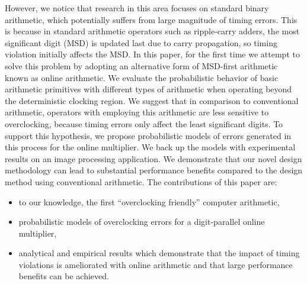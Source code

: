 \documentclass{acm_proc_article-sp}
\begin{document}
However, we notice that research in this area focuses on standard binary arithmetic, which potentially suffers from large magnitude of timing errors. This is because in standard arithmetic operators such as ripple-carry adders, the most significant digit (MSD) is updated last due to carry propagation, so timing violation initially affects the MSD. In this paper, for the first time we attempt to solve this problem by adopting an alternative form of MSD-first arithmetic known as online arithmetic. We evaluate the probabilistic behavior of basic arithmetic primitives with different types of arithmetic when operating beyond the deterministic clocking region. We suggest that in comparison to conventional arithmetic, operators with employing this arithmetic are less sensitive to overclocking, because timing errors only affect the least significant digits. To support this hypothesis, we propose probabilistic models of errors generated in this process for the online multiplier. We back up the models with experimental results on an image processing application. We demonstrate that our novel design methodology can lead to substantial performance benefits compared to the design method using conventional arithmetic. The contributions of this paper are:
%
\begin{itemize}
\vspace{-2.5ex}
  \item to our knowledge, the first ``overclocking friendly'' computer arithmetic,\vspace{-.5ex}
  \item probabilistic models of overclocking errors for a digit-parallel online multiplier,\vspace{-.5ex}
  \item analytical and empirical results which demonstrate that the impact of timing violations is ameliorated with online arithmetic and that large performance benefits can be achieved.
\end{itemize}



\end{document}
